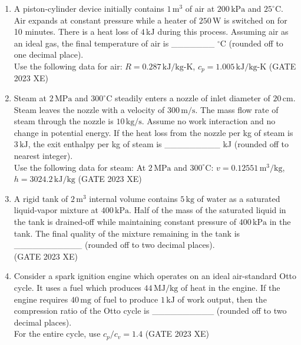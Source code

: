 \documentclass[journal,12pt,onecolumn]{IEEEtran}
\begin{document}
\begin{enumerate}
\item A piston-cylinder device initially contains $1\,\mathrm{m^3}$ of air at $200\,\mathrm{kPa}$ and $25^{\circ}\mathrm{C}$. Air expands at constant pressure while a heater of $250\,\mathrm{W}$ is switched on for 10 minutes. There is a heat loss of $4\,\mathrm{kJ}$ during this process. Assuming air as an ideal gas, the final temperature of air is \_\_\_\_\_\_\_ $^{\circ}\mathrm{C}$ (rounded off to one decimal place). \\
Use the following data for air: $R=0.287\,\mathrm{kJ/kg\text{-}K}$, $c_p=1.005\,\mathrm{kJ/kg\text{-}K}$
\hfill{(GATE 2023 XE)}\\

\item Steam at $2\,\mathrm{MPa}$ and $300^{\circ}\mathrm{C}$ steadily enters a nozzle of inlet diameter of $20\,\mathrm{cm}$. Steam leaves the nozzle with a velocity of $300\,\mathrm{m/s}$. The mass flow rate of steam through the nozzle is $10\,\mathrm{kg/s}$. Assume no work interaction and no change in potential energy. If the heat loss from the nozzle per kg of steam is $3\,\mathrm{kJ}$, the exit enthalpy per kg of steam is \_\_\_\_\_\_\_\_\_ kJ (rounded off to nearest integer). \\
Use the following data for steam: At $2\,\mathrm{MPa}$ and $300^{\circ}\mathrm{C}$: $v=0.12551\,\mathrm{m^3/kg}$, $h=3024.2\,\mathrm{kJ/kg}$
\hfill{(GATE 2023 XE)}\\

\item A rigid tank of $2\,\mathrm{m^3}$ internal volume contains $5\,\mathrm{kg}$ of water as a saturated liquid-vapor mixture at $400\,\mathrm{kPa}$. Half of the mass of the saturated liquid in the tank is drained-off while maintaining constant pressure of $400\,\mathrm{kPa}$ in the tank. The final quality of the mixture remaining in the tank is \_\_\_\_\_\_\_\_\_\_\_ (rounded off to two decimal places). \\
\hfill{(GATE 2023 XE)}\\

\item Consider a spark ignition engine which operates on an ideal air-standard Otto cycle. It uses a fuel which produces $44\,\mathrm{MJ/kg}$ of heat in the engine. If the engine requires $40\,\mathrm{mg}$ of fuel to produce $1\,\mathrm{kJ}$ of work output, then the compression ratio of the Otto cycle is \_\_\_\_\_\_\_\_\_\_ (rounded off to two decimal places). \\
For the entire cycle, use $c_p/c_v=1.4$
\hfill{(GATE 2023 XE)}\\


\end{enumerate}
\end{document}
